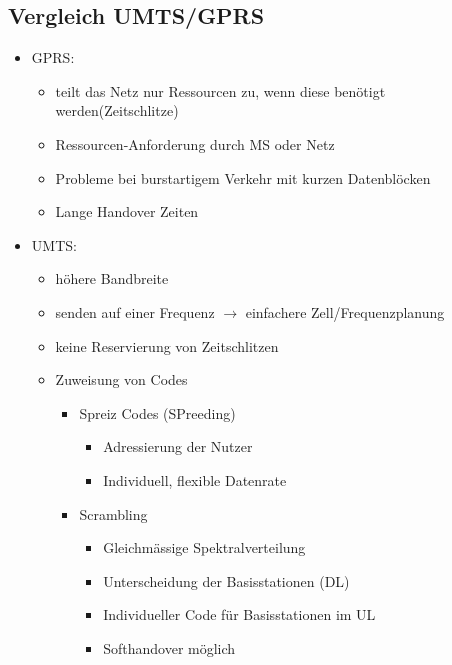 \begin{minipage}{0.7\linewidth}
\subsection{Vergleich UMTS/GPRS}
\begin{itemize}
\item GPRS:
\begin{itemize}
\item teilt das Netz nur Ressourcen zu, wenn diese benötigt werden(Zeitschlitze) 
\item Ressourcen-Anforderung durch MS oder Netz
\item Probleme bei burstartigem Verkehr mit kurzen Datenblöcken
\item Lange Handover Zeiten
\end{itemize}
\item UMTS:
\begin{itemize}
\item höhere Bandbreite
\item senden auf einer Frequenz $\rightarrow$ einfachere Zell/Frequenzplanung
\item keine Reservierung von Zeitschlitzen
\item Zuweisung von Codes
\begin{itemize}
\item Spreiz Codes (SPreeding)
\begin{itemize}
\item Adressierung der Nutzer
\item Individuell, flexible Datenrate
\end{itemize}
\item Scrambling
\begin{itemize}
\item Gleichmässige Spektralverteilung
\item Unterscheidung der Basisstationen (DL)
\item Individueller Code für Basisstationen im UL
\item Softhandover möglich
\end{itemize}
\end{itemize}
\end{itemize}
\end{itemize}
\end{minipage}